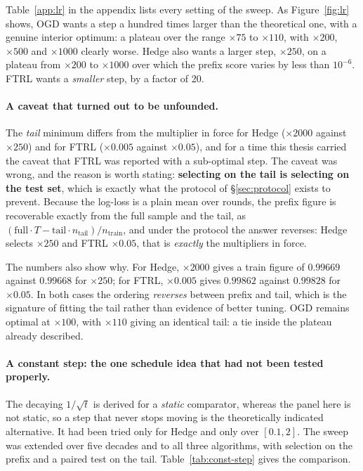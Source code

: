 \documentclass[12pt,a4paper,oneside]{report}
\renewcommand{\_}{\oldunderscore\allowbreak}
\theoremstyle{definition}
\theoremstyle{plain}
\theoremstyle{definition}   %
\begin{document}
Table~\ref{app:lr} in the appendix lists every setting of the sweep. As Figure~\ref{fig:lr}
shows, OGD wants a step a hundred times larger than the theoretical one,
with a genuine interior optimum: a plateau over the range $\times 75$ to $\times 110$, with
$\times 200$, $\times 500$
and $\times 1000$ clearly worse. Hedge also wants a larger step, $\times 250$, on a plateau from
$\times 200$ to $\times 1000$ over which the prefix score varies by less than $10^{-6}$. FTRL wants a
\emph{smaller} step, by a factor of 20.

\paragraph{A caveat that turned out to be unfounded.} The \emph{tail} minimum differs from the
multiplier in force for Hedge ($\times 2000$ against $\times 250$) and for FTRL ($\times 0.005$
against $\times 0.05$), and for a time this thesis carried the caveat that FTRL was reported
with a sub-optimal step. The
caveat was wrong, and the reason is worth stating: \textbf{selecting on the tail is selecting on
the test set}, which is exactly what the protocol of \S\ref{sec:protocol} exists to prevent.
Because the log-loss is a plain mean over rounds, the prefix figure is recoverable exactly from
the full sample and the tail, as
$(\text{full}\cdot T - \text{tail}\cdot n_{\text{tail}})/n_{\text{train}}$, and under the protocol
the answer reverses: Hedge selects $\times 250$ and FTRL $\times 0.05$, that is \emph{exactly}
the multipliers in force.

The numbers also show why. For Hedge, $\times 2000$ gives a train figure of $0.99669$ against
$0.99668$ for $\times 250$; for FTRL, $\times 0.005$ gives $0.99862$ against $0.99828$ for
$\times 0.05$. In both cases the ordering \emph{reverses} between prefix and tail, which is the
signature of fitting the tail rather than evidence of better tuning. OGD remains optimal at
$\times 100$, with $\times 110$ giving an identical tail: a tie inside the plateau already
described.

\paragraph{A constant step: the one schedule idea that had not been tested properly.} The decaying
$1/\sqrt{t}$ is derived for a \emph{static} comparator, whereas the panel here is not static, so a
step that never stops moving is the theoretically indicated alternative. It had been tried only
for Hedge and only over $[0.1, 2]$. The sweep was extended over five decades and to all three
algorithms, with selection on the prefix and a paired test on the tail. Table~\ref{tab:const-step} gives the comparison.
\end{document}
